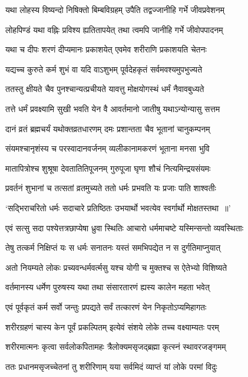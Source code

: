 \twolineshloka
{यथा लोहस्य विष्यन्दो निषिक्तो बिम्बविग्रहम्}
{उपैति तद्वज्जानीहि गर्भे जीवप्रवेशनम्}


\threelineshloka
{लोहपिण्डं यथा वह्निः प्रविश्य ह्यतितापयेत्}
{तथा त्वमपि जानीहि गर्भे जीवोपपादनम्}
{}


\twolineshloka
{यथा च दीपः शरणं दीप्यमानः प्रकाशयेत्}
{एवमेव शरीराणि प्रकाशयति चेतनः}


\twolineshloka
{यद्यच्च कुरुते कर्म शुभं वा यदि वाऽशुभम्}
{पूर्वदेहकृतं सर्वमवश्यमुपभुज्यते}


\twolineshloka
{ततस्तु क्षीयते चैव पुनश्चान्यत्प्रचीयते}
{यावत्तु मोक्षयोगस्थं धर्मं नैवावबुध्यते}


\twolineshloka
{तत्ते धर्मं प्रवक्ष्यामि सुखी भवति येन वै}
{आवर्तमानो जातीषु यथाऽन्योन्यासु सत्तम}


\twolineshloka
{दानं व्रतं ब्रह्मचर्यं यथोक्तव्रतधारणम्}
{दमः प्रशान्तता चैव भूतानां चानुकम्पनम्}


\twolineshloka
{संयमश्चानृशंस्य च परस्वादानवर्जनम्}
{व्यलीकानामकरणं भूताना मनसा भुवि}


\twolineshloka
{मातापित्रोश्च शुश्रूषा देवतातितिपूजनम्}
{गुरुपूजा घृणा शौचं नित्यमिन्द्रयसंयमः}


\twolineshloka
{प्रवर्तनं शुभानां च तत्सतां व्रतमुच्यते}
{ततो धर्मः प्रभवति यः प्रजाः पाति शाश्वतीः}


\twolineshloka
{`सद्भिराचरितो धर्मः सदाचारे प्रतिष्ठितः}
{उभयार्थो भवत्येव स्वर्गार्थो मोक्षतस्तथा ॥'}


\twolineshloka
{एवं सत्सु सदा पश्येत्तत्रछाप्येषा ध्रुवा स्थितिः}
{आचारो धर्ममाचष्टे यस्मिन्सन्तो व्यवस्थिताः}


\twolineshloka
{तेषु तत्कर्म निक्षिप्तं यः स धर्मः सनातनः}
{यस्तं समभिपद्येत न स दुर्गतिमाप्नुयात्}


\twolineshloka
{अतो नियम्यते लोकः प्रच्यवन्धर्मवर्त्मसु}
{यश्च योगी च मुक्तश्च स ऐतेभ्यो विशिष्यते}


\twolineshloka
{वर्तमानस्य धर्मेण पुरुषस्य यथा तथा}
{संसारतारणं ह्यस्य कालेन महता भवेत्}


\twolineshloka
{एवं पूर्वकृतं कर्म सर्वो जन्तुः प्रपद्यते}
{सर्वं तत्कारणं येन निकृतोऽप्यमिहागतः}


\twolineshloka
{शरीरग्रहणं चास्य केन पूर्वं प्रकल्पितम्}
{इत्येवं संशये लोके तच्च वक्ष्याम्यतः परम्}


\twolineshloka
{शरीरमात्मनः कृत्वा सर्वलोकपितामहः}
{त्रैलोक्यमसृजद्ब्रह्मा कृत्स्नं स्थावरजङ्गमम्}


\twolineshloka
{ततः प्रधानमसृजच्चेतनां तु शरीरिणाम्}
{यया सर्वमिदं व्याप्तं यां लोके परमां विदुः}


